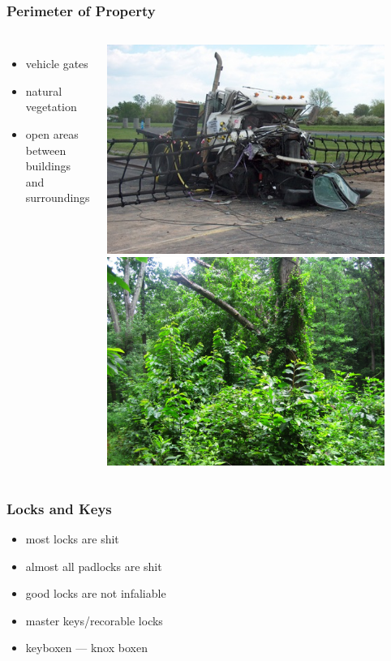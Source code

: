 \documentclass[]{beamer}
\begin{document}
\begin{frame}
  \frametitle{Perimeter of Property}
  \begin{columns}[c]
    \begin{itemize}
      \item vehicle gates
      \item natural vegetation
      \item open areas between buildings and surroundings
    \end{itemize}
    \includegraphics[width=0.9\textwidth]{vehicle-impact2}
    \vspace{2mm}
    \includegraphics[width=0.9\textwidth]{vegetation}
  \end{columns}
\end{frame}

\begin{frame}
  \frametitle{Locks and Keys}
  \begin{itemize}
    \item most locks are shit
    \item almost all padlocks are shit
    \item good locks are not infaliable
    \item master keys/recorable locks
    \item keyboxen --- knox boxen
  \end{itemize}
\end{frame}
\end{document}
